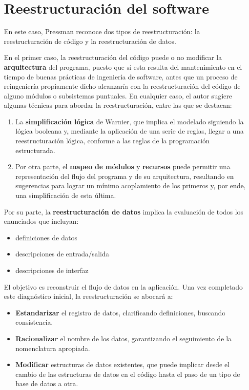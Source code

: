 \section{Reestructuración del software}

En este caso, Pressman reconoce dos tipos de reestructuración: 
la reestructuración de código y la reestructuración de datos.

En el primer caso,
la reestructuración del código puede o no modificar la \textbf{arquitectura}
del programa,
puesto que si esta resulta del mantenimiento en el tiempo de buenas prácticas
de ingeniería de software,
antes que un proceso de reingeniería propiamente dicho alcanzaría con la 
reestructuración del código de alguno módulos o subsistemas puntuales.
En cualquier caso,
el autor sugiere algunas técnicas para abordar la reestructuración,
entre las que se destacan:
\begin{enumerate}
    \item La \textbf{simplificación lógica} de Warnier,
    que implica el modelado siguiendo la lógica booleana y,
    mediante la aplicación de una serie de reglas,
    llegar a una reestructuración lógica,
    conforme a las reglas de la programación estructurada.
    \item Por otra parte, el \textbf{mapeo de módulos} y \textbf{recursos}
    puede permitir una representación del flujo del programa y de su arquitectura,
    resultando en sugerencias para lograr un mínimo acoplamiento de los primeros 
    y, por ende, una simplificación de esta última.
\end{enumerate}

Por su parte, la \textbf{reestructuración de datos} implica la evaluación 
de todos los enunciados que incluyan:
\begin{itemize}
    \item definiciones de datos 
    \item descripciones de entrada/salida 
    \item descripciones de interfaz
\end{itemize}

El objetivo es reconstruir el flujo de datos en la aplicación.
Una vez completado este diagnóstico inicial,
la reestructuración se abocará a:
\begin{itemize}
    \item \textbf{Estandarizar} el registro de datos,
    clarificando definiciones,
    buscando consistencia.
    \item \textbf{Racionalizar} el nombre de los datos,
    garantizando el seguimiento de la nomenclatura apropiada.
    \item \textbf{Modificar} estructuras de datos existentes,
    que puede implicar desde el cambio de las estructuras de datos en el código 
    hasta el paso de un tipo de base de datos a otra.
\end{itemize}
